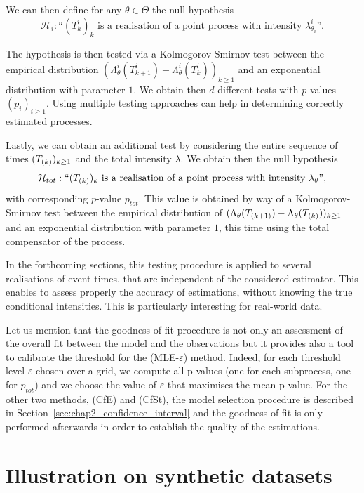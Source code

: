     We can then define for any $\theta\in\Theta$ the null hypothesis
    \[
      \mathcal H_i : \text{``} (T_k^i)_k \text{ is a realisation of a point process with intensity } \lambda_{\theta_i}^i \text{''}.
    \]
    
    The hypothesis is then tested via a Kolmogorov-Smirnov test between the empirical distribution $(\Lambda_\theta^i(T_{k+1}^i) - \Lambda_\theta^i(T_k^i))_{k\geq 1}$ and an exponential distribution with parameter $1$. We obtain then $d$ different tests with $p$-values $(p_i)_{i\geq 1}$.
    Using multiple testing approaches can help in determining correctly estimated processes.

    Lastly, we can obtain an additional test by considering the entire sequence of times $(T\park)_{k\geq 1}$ and the total intensity $\lambda$. We obtain then the null hypothesis
    \[
      \mathcal{H}_{tot} : \text{``} (T\park)_k \text{ is a realisation of a point process with intensity } \lambda_\theta \text{''},
    \]
    with corresponding $p$-value $p_{tot}$. This value is obtained by way of a Kolmogorov-Smirnov test between the empirical distribution of $(\Lambda_\theta(T\park[k+1]) - \Lambda_\theta(T\park[k]))_{k\geq 1}$ and an exponential distribution with parameter $1$, this time using the total compensator of the process.

    In the forthcoming sections, this testing procedure is applied to several realisations of event times, that are independent of the considered estimator.
    This enables to assess properly the accuracy of estimations, without knowing the true conditional intensities.
    This is particularly interesting for real-world data.

    Let us mention that the goodness-of-fit procedure is not only an assessment of the overall fit between the model and the observations but it provides also a tool to calibrate the threshold for the (MLE-$\varepsilon$) method. Indeed, for each threshold level $\varepsilon$ chosen over a grid, we compute all p-values (one for each subprocess, one for $p_{tot}$) and we choose the value of $\varepsilon$ that maximises the mean p-value. For the other two methods, (CfE) and (CfSt), the model selection procedure is described in Section~\ref{sec:chap2_confidence_interval} and the goodness-of-fit is only performed afterwards in order to establish the quality of the estimations.

\section{Illustration on synthetic datasets}\label{sec:chap2_numerical}
